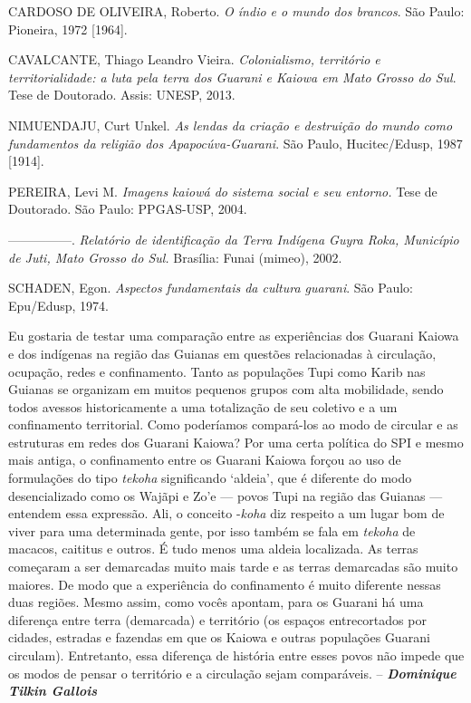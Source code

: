 CARDOSO DE OLIVEIRA, Roberto. \emph{O índio e o mundo dos brancos}. São
Paulo: Pioneira, 1972 {[}1964{]}.

CAVALCANTE, Thiago Leandro Vieira. \emph{Colonialismo, território e
territorialidade: a luta pela terra dos Guarani e Kaiowa em Mato Grosso
do Sul}. Tese de Doutorado. Assis: UNESP, 2013.

NIMUENDAJU, Curt Unkel. \emph{As lendas da criação e destruição do mundo
como fundamentos da religião dos Apapocúva-Guarani}. São Paulo,
Hucitec/Edusp, 1987 {[}1914{]}.

PEREIRA, Levi M. \emph{Imagens kaiowá do sistema social e seu entorno.}
Tese de Doutorado. São Paulo: PPGAS-USP, 2004.

---------------. \emph{Relatório de identificação da Terra Indígena
Guyra Roka, Município de Juti, Mato Grosso do Sul.} Brasília: Funai
(mimeo), 2002.

SCHADEN, Egon. \emph{Aspectos fundamentais da cultura guarani}. São
Paulo: Epu/Edusp, 1974.

Eu gostaria de testar uma comparação entre as experiências dos Guarani
Kaiowa e dos indígenas na região das Guianas em questões relacionadas à
circulação, ocupação, redes e confinamento. Tanto as populações Tupi
como Karib nas Guianas se organizam em muitos pequenos grupos com alta
mobilidade, sendo todos avessos historicamente a uma totalização de seu
coletivo e a um confinamento territorial. Como poderíamos compará-los ao
modo de circular e as estruturas em redes dos Guarani Kaiowa? Por uma
certa política do SPI e mesmo mais antiga, o confinamento entre os
Guarani Kaiowa forçou ao uso de formulações do tipo \emph{tekoha}
significando `aldeia', que é diferente do modo desencializado como os
Wajãpi e Zo'e --- povos Tupi na região das Guianas --- entendem essa
expressão. Ali, o conceito -\emph{koha} diz respeito a um lugar bom de
viver para uma determinada gente, por isso também se fala em
\emph{tekoha} de macacos, caititus e outros. É tudo menos uma aldeia
localizada. As terras começaram a ser demarcadas muito mais tarde e as
terras demarcadas são muito maiores. De modo que a experiência do
confinamento é muito diferente nessas duas regiões. Mesmo assim, como
vocês apontam, para os Guarani há uma diferença entre terra (demarcada)
e território (os espaços entrecortados por cidades, estradas e fazendas
em que os Kaiowa e outras populações Guarani circulam). Entretanto, essa
diferença de história entre esses povos não impede que os modos de
pensar o território e a circulação sejam comparáveis. --
\emph{\textbf{Dominique Tilkin Gallois}}

